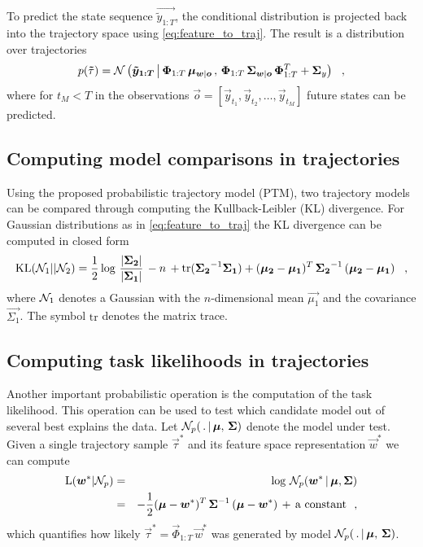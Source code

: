 To predict the state sequence $\vec{\tilde{y}_{1:T}}$, the 
conditional distribution is projected back into the trajectory space using \eqref{eq:feature_to_traj}. 
The result is a distribution over trajectories %
\begin{eqnarray}
  p(\boldsymbol{\tilde}{\tau}) = \mathcal{N}\left(\boldsymbol{\tilde{y}_{1:T}} \, \middle| \, \boldsymbol{\Phi}_{1:T} \, \boldsymbol{\mu}_{\boldsymbol{w}| \boldsymbol{o}} \, , \, \boldsymbol{\Phi}_{1:T} \, 
		  \boldsymbol{\Sigma}_{\boldsymbol{w}|\boldsymbol{o}} \, \boldsymbol{\Phi}_{1:T}^T + \boldsymbol{\Sigma}_y\right) ~~, \label{eq:cond_prob_traj}
\end{eqnarray}
where for $t_M < T$ in the observations $\vec o = [\vec y_{t_1}, \vec y_{t_2}, \dots, \vec y_{t_M}]$ future states can be predicted.

\subsection{Computing model comparisons in trajectories}

Using the proposed probabilistic trajectory model (PTM), two trajectory models can be compared through computing the Kullback-Leibler (KL) divergence. 
For Gaussian distributions as in \eqref{eq:feature_to_traj} the KL divergence can be computed in closed form 
\begin{eqnarray*}
 \textrm{KL}(\mathcal{N}_1 || \mathcal{N}_2) = \frac{1}{2} \, { \log \, \frac{ |\boldsymbol{\Sigma_2}| }{ |\boldsymbol{\Sigma_1}| } \, - n \, + \textrm{tr}({\boldsymbol{\Sigma_2}}^{-1} \boldsymbol{\Sigma_1}) 
 + (\boldsymbol{\mu_2} - \boldsymbol{\mu_1})^T \, {\boldsymbol{\Sigma_2}}^{-1} \,  (\boldsymbol{\mu_2} - \boldsymbol{\mu_1}) 
 \, } ~~,  
\end{eqnarray*}
where $\mathcal{N}_1$ denotes a Gaussian with the $n$-dimensional mean $\vec{\mu_1}$ and the covariance $\vec{\Sigma_1}$. The symbol $\textrm{tr}$ denotes the matrix trace. 

\subsection{Computing task likelihoods in trajectories}

Another important probabilistic operation is the computation of the task likelihood. 
This operation can be used to test which candidate model out of several best explains the data. 
Let $\mathcal{N}_p(\, . \, | \, \boldsymbol{\mu}, \, \boldsymbol{\Sigma})$ denote the model under test. 
Given a single trajectory sample $\vec \tau^*$ and its feature space representation $\vec w^*$ we can compute  
\begin{eqnarray*}
 \textrm{L}(\boldsymbol{w}^* | \mathcal{N}_p) &=& \log \, \mathcal{N}_p(\boldsymbol{w}^* \, | \, \boldsymbol{\mu}, \boldsymbol{\Sigma} ) \\ 
 &=& - \frac{1}{2} (\boldsymbol{\mu} - \boldsymbol{w}^*)^T \, {\boldsymbol{\Sigma}}^{-1} \,  (\boldsymbol{\mu} - \boldsymbol{w}^*) \, + \, \textrm{a constant} ~~,  
\end{eqnarray*}
which quantifies how likely $\vec \tau^* = \vec \Phi_{1:T} \, \vec w^*$  was generated by model $\mathcal{N}_p(\, . \, | \, \boldsymbol{\mu}, \, \boldsymbol{\Sigma})$. 


